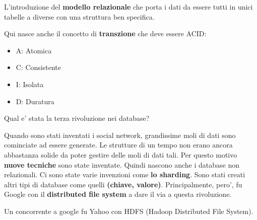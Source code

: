 L'introduzione del \textbf{modello relazionale} che porta i dati da essere tutti in unici tabelle a diverse con una struttura ben specifica.

Qui nasce anche il concetto di \textbf{transzione} che deve essere ACID:
\begin{itemize}
    \item A: Atomica
    \item C: Consistente
    \item I: Isolata
    \item D: Duratura
\end{itemize}

\begin{domanda}
    Qual e' stata la terza rivoluzione nei database?
\end{domanda}

Quando sono stati inventati i social network, grandissime moli di dati sono cominciate ad essere generate.
Le strutture di un tempo non erano ancora abbastanza solide da poter gestire delle moli di dati tali. Per questo motivo \textbf{nuove tecniche} sono state inventate.
Quindi nascono anche i database non relazionali.
Ci sono state varie invenzioni come \textbf{lo sharding}. Sono stati creati altri tipi di database come quelli \textbf{(chiave, valore)}.
Principalmente, pero', fu Google con il \textbf{distributed file system} a dare il via a questa rivoluzione.

Un concorrente a google fu Yahoo con HDFS (Hadoop Distributed File System).

\newpage